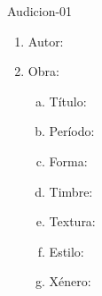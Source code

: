 \begin{defproblem}{Audicion-01}
\begin{multicols}{2}
\begin{ejercicio}[]
	\begin{enumerate}[1.-]
        \vspace*{0.3cm}
		\item
			Autor: \dotfill
			\vspace*{0.3cm}
		\item
			Obra:
			\begin{enumerate}[a)]
			    \item Título: \dotfill \vspace*{0.3cm}
			    \item Período: \dotfill \vspace*{0.3cm}
			    \item Forma: \dotfill \vspace*{0.3cm}
			    \item Timbre: \dotfill \vspace*{0.3cm} 		
			    \item Textura: \dotfill \vspace*{0.3cm}
			    \item Estilo: \dotfill \vspace*{0.3cm}
			    \item Xénero: \dotfill \vspace*{0.3cm}
			\end{enumerate}
			\vspace*{2.0cm}			
	\end{enumerate}
\end{ejercicio}


\end{multicols}
\end{defproblem}
